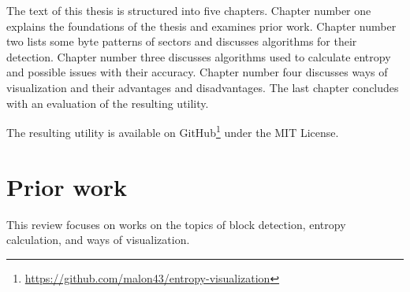 \documentclass[
  digital, %
  oneside, %
  lof,     %
  lot,     %
]{fithesis4}
\def\textrussian#1{{\usefont{T2A}{PTSerif-TLF}{m}{rm}#1}}
\begin{document}
The text of this thesis is structured into five chapters.
Chapter number one explains the foundations of the thesis and examines prior work.
Chapter number two lists some byte patterns of sectors and discusses algorithms for their detection.
Chapter number three discusses algorithms used to calculate entropy and possible issues with their accuracy.
Chapter number four discusses ways of visualization and their advantages and disadvantages.
The last chapter concludes with an evaluation of the resulting utility.

The resulting utility is available on GitHub\footnote{\url{https://github.com/malon43/entropy-visualization}} under the MIT License.





\chapter{Prior work} %
This review focuses on works on the topics of block detection, entropy calculation, and ways of visualization.
\end{document}
